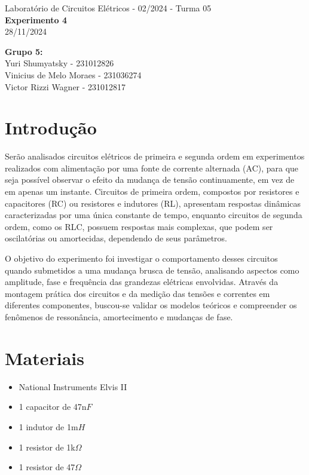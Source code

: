 \documentclass[a4 paper]{article}
\newcommand{\parag}{\hspace{30pt}}
\begin{document}
\justifying
\begin{center}{\large Laboratório de Circuitos Elétricos - 02/2024 - Turma 05}\\
{\large \textbf{Experimento 4}}\\ 
28/11/2024
\end{center}

\vspace{500pt}
 \noindent\textbf{Grupo 5:}\\
 Yuri Shumyatsky - 231012826\\
Vinicius de Melo Moraes - 231036274\\
Victor Rizzi Wagner - 231012817


\vspace{30pt}
\newpage

\section{Introdução}

\parag Serão analisados circuitos elétricos de primeira e segunda ordem em experimentos realizados com alimentação por uma fonte de corrente alternada (AC), para que seja possível observar o efeito da mudança de tensão continuamente, em vez de em apenas um instante. Circuitos de primeira ordem, compostos por resistores e capacitores (RC) ou resistores e indutores (RL), apresentam respostas dinâmicas caracterizadas por uma única constante de tempo, enquanto circuitos de segunda ordem, como os RLC, possuem respostas mais complexas, que podem ser oscilatórias ou amortecidas, dependendo de seus parâmetros.

O objetivo do experimento foi investigar o comportamento desses circuitos quando submetidos a uma mudança brusca de tensão, analisando aspectos como amplitude, fase e frequência das grandezas elétricas envolvidas. Através da montagem prática dos circuitos e da medição das tensões e correntes em diferentes componentes, buscou-se validar os modelos teóricos e compreender os fenômenos de ressonância, amortecimento e mudanças de fase.

\vspace{70pt}
\section{Materiais}

	\begin{itemize}
	\item National Instruments Elvis II
	\item 1 capacitor de 47n$F$
	\item 1 indutor de 1m$H$
	\item 1 resistor de 1k$\Omega$
	\item 1 resistor de 47$\Omega$
	\end{itemize}
\end{document}
